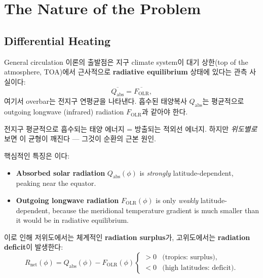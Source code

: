 \section{The Nature of the Problem}\label{sec:nature}

\subsection{Differential Heating}\label{subsec:diff-heating}

General circulation 이론의 출발점은 지구 climate system이
대기 상한(top of the atmosphere, TOA)에서 근사적으로 \textbf{radiative equilibrium}
상태에 있다는 관측 사실이다:
\begin{equation}\label{eq:global-balance}
  \overline{Q_{\mathrm{abs}}} = \overline{F_{\mathrm{OLR}}},
\end{equation}
여기서 overbar는 전지구 연평균을 나타낸다.  흡수된 태양복사
$Q_{\mathrm{abs}}$는 평균적으로 outgoing longwave (infrared) radiation
$F_{\mathrm{OLR}}$과 같아야 한다.

\begin{hisublock}
  전지구 평균적으로 흡수되는 태양 에너지 = 방출되는 적외선 에너지.
  하지만 \textit{위도별로} 보면 이 균형이 깨진다 --- 그것이 순환의 근본 원인.
\end{hisublock}

핵심적인 특징은 이다:
\begin{itemize}
  \item \textbf{Absorbed solar radiation} $Q_{\mathrm{abs}}(\phi)$ is \emph{strongly}
    latitude-dependent, peaking near the equator.
  \item \textbf{Outgoing longwave radiation} $F_{\mathrm{OLR}}(\phi)$ is only
    \emph{weakly} latitude-dependent, because the meridional temperature gradient
    is much smaller than it would be in radiative equilibrium.
\end{itemize}

\noindent 이로 인해 저위도에서는 체계적인 \textbf{radiation surplus}가,
고위도에서는 \textbf{radiation deficit}이 발생한다:
\begin{equation}\label{eq:net-rad}
  R_{\mathrm{net}}(\phi) = Q_{\mathrm{abs}}(\phi) - F_{\mathrm{OLR}}(\phi)
  \begin{cases}
    > 0 & \text{(tropics: surplus)}, \\
    < 0 & \text{(high latitudes: deficit)}.
  \end{cases}
\end{equation}

